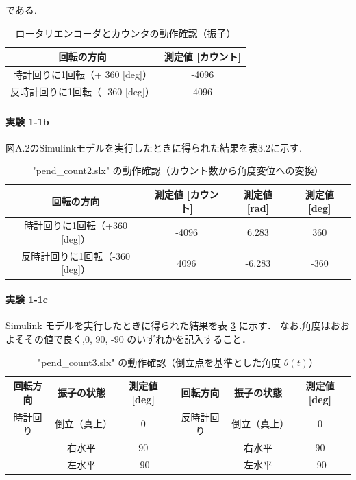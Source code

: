 である.

\begin{table}[h]
  \centering
  \caption{ロータリエンコーダとカウンタの動作確認（振子）}
  \label{tab:rotation}
  \begin{tabular}{|c|c|}
    \hline
    回転の方向                       & 測定値 [カウント] \\
    \hline
    時計回りに1回転（+ 360 [deg]）   & -4096             \\
    反時計回りに1回転（- 360 [deg]） & 4096              \\
    \hline
  \end{tabular}
\end{table}
\paragraph{実験 1-1b}
図A.2のSimulinkモデルを実行したときに得られた結果を表3.2に示す.

\begin{table}[h]
  \centering
  \caption{"pend\_count2.slx" の動作確認（カウント数から角度変位への変換）}
  \label{tab:pend_count2}
  \begin{tabular}{|c|c|c|c|}
    \hline
    回転の方向                      & 測定値 [カウント] & 測定値 [rad] & 測定値 [deg] \\
    \hline
    時計回りに1回転（+360 [deg]）   & -4096             & 6.283        & 360          \\
    反時計回りに1回転（-360 [deg]） & 4096              & -6.283       & -360         \\
    \hline
  \end{tabular}
\end{table}

\paragraph{実験 1-1c}
Simulink モデルを実行したときに得られた結果を表 \ref{tab:pend_count3} に示す．
なお,角度はおおよそその値で良く,0, 90, -90 のいずれかを記入すること．

\begin{table}[h]
  \centering
  \caption{"pend\_count3.slx" の動作確認（倒立点を基準とした角度 $\theta(t)$）}
  \label{tab:pend_count3}
  \begin{tabular}{|c|c|c|c|c|c|}
    \hline
    回転方向 & 振子の状態   & 測定値 [deg] & 回転方向   & 振子の状態   & 測定値 [deg] \\
    \hline
    時計回り & 倒立（真上） & 0            & 反時計回り & 倒立（真上） & 0            \\
             & 右水平       & 90           &            & 右水平       & 90           \\
             & 左水平       & -90          &            & 左水平       & -90          \\
    \hline
  \end{tabular}
\end{table}


